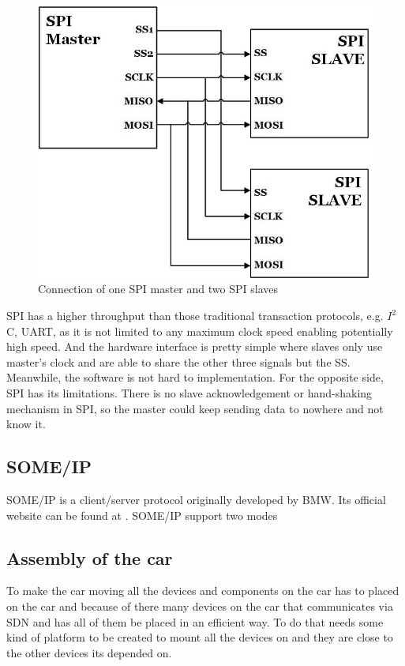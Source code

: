 \documentclass[11pt, titlepage]{article} %
\begin{document}
\begin{figure}[H]
	\centering
   	\includegraphics[scale=0.5]{spi-literature.jpg}
   	\caption{Connection of one SPI master and two SPI slaves}
    \label{fig:spi-literature}
\end{figure}

SPI has a higher throughput than those traditional transaction protocols, e.g. $I^{2}$C, UART, as it is not limited to any maximum clock speed enabling potentially high speed. And the hardware interface is pretty simple where slaves only use master's clock and are able to share the other three signals but the SS. Meanwhile, the software is not hard to implementation. For the opposite side, SPI has its limitations. There is no slave acknowledgement or hand-shaking mechanism in SPI, so the master could keep sending data to nowhere and not know it.

\subsection{SOME/IP}
SOME/IP is a client/server protocol originally developed by BMW. Its official website can be found at \cite{someip}.
SOME/IP support two modes

\subsection{Assembly of the car}
To make the car moving all the devices and components on the car has to placed on the car and because of there many devices on the car that communicates via SDN and has all of them be placed in an efficient way. To do that needs some kind of platform to be created to mount all the devices on and they are close to the other devices its depended on. 
\end{document}
